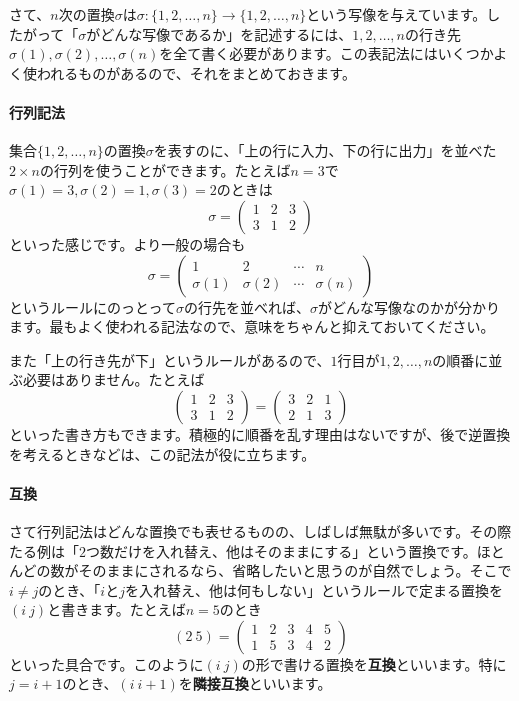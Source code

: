 さて、$n$次の置換$\sigma$は$\sigma\colon \{1, 2, \ldots, n\} \rightarrow \{1, 2, \ldots, n\}$という写像を与えています。したがって「$\sigma$がどんな写像であるか」を記述するには、$1, 2, \ldots, n$の行き先$\sigma(1), \sigma(2), \ldots, \sigma(n)$を全て書く必要があります。この表記法にはいくつかよく使われるものがあるので、それをまとめておきます。

\paragraph{行列記法}

集合$\{1, 2, \ldots, n\}$の置換$\sigma$を表すのに、「上の行に入力、下の行に出力」を並べた$2\times n$の行列を使うことができます。たとえば$n = 3$で$\sigma(1) = 3, \sigma(2) = 1, \sigma(3) = 2$のときは
\[
\sigma =
\begin{pmatrix}
1 & 2 & 3 \\
3 & 1 & 2
\end{pmatrix}
\]
といった感じです。より一般の場合も
\[
\sigma =
\begin{pmatrix}
1 & 2 & \cdots & n \\
\sigma(1) & \sigma(2) & \cdots & \sigma(n)
\end{pmatrix}
\]
というルールにのっとって$\sigma$の行先を並べれば、$\sigma$がどんな写像なのかが分かります。最もよく使われる記法なので、意味をちゃんと抑えておいてください。

また「上の行き先が下」というルールがあるので、$1$行目が$1, 2, \ldots, n$の順番に並ぶ必要はありません。たとえば
\[
\begin{pmatrix}
1 & 2 & 3 \\
3 & 1 & 2
\end{pmatrix}
=
\begin{pmatrix}
3 & 2 & 1 \\
2 & 1 & 3
\end{pmatrix}
\]
といった書き方もできます。積極的に順番を乱す理由はないですが、後で逆置換を考えるときなどは、この記法が役に立ちます。

\paragraph{互換}

さて行列記法はどんな置換でも表せるものの、しばしば無駄が多いです。その際たる例は「$2$つ数だけを入れ替え、他はそのままにする」という置換です。ほとんどの数がそのままにされるなら、省略したいと思うのが自然でしょう。そこで$i \neq j$のとき、「$i$と$j$を入れ替え、他は何もしない」というルールで定まる置換を$(i\ j)$と書きます。たとえば$n = 5$のとき
\[
(2\ 5) =
\begin{pmatrix}
1 & 2 & 3 & 4 & 5 \\
1 & 5 & 3 & 4 & 2
\end{pmatrix}
\]
といった具合です。このように$(i\ j)$の形で書ける置換を\textbf{互換}といいます。特に$j = i + 1$のとき、$(i\ i+1)$を\textbf{隣接互換}といいます。

